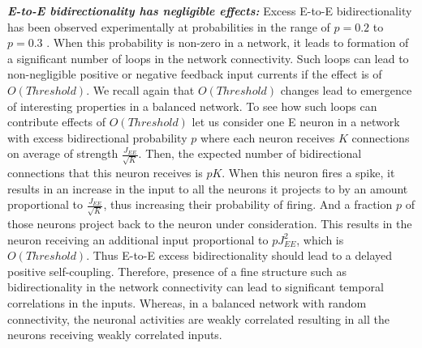 \emph{\textbf{E-to-E bidirectionality has negligible effects:}} Excess E-to-E bidirectionality has been observed experimentally at probabilities in the range of $p = 0.2$ to $p = 0.3$ \cite{Song2005}. When this probability is non-zero in a network, it leads to formation of a significant number of loops in the network connectivity. Such loops can lead to non-negligible positive or negative feedback input currents if the effect is of $O(Threshold)$. We recall again that $O(Threshold)$ changes lead to emergence of interesting properties in a balanced network. To see how such loops can contribute effects of $O(Threshold)$ let us consider one E neuron in a network with excess bidirectional probability $p$ where each neuron receives $K$ connections on average of strength $\frac{J_{EE}}{\sqrt{K}}$. Then, the expected number of bidirectional connections that this neuron receives is $pK$. When this neuron fires a spike, it results in an increase in the input to all the neurons it projects to by an amount proportional to $\frac{J_{EE}}{\sqrt{K}}$, thus increasing their probability of firing. And a fraction $p$ of those neurons project back to the neuron under consideration. This results in the neuron receiving an additional input proportional to $p J_{EE}^{2}$, which is $O(Threshold)$. Thus E-to-E excess bidirectionality should lead to a delayed positive self-coupling. Therefore, presence of a fine structure such as bidirectionality in the network connectivity can lead to significant temporal correlations in the inputs. Whereas, in a balanced network with random connectivity, the neuronal activities are weakly correlated resulting in all the neurons receiving weakly correlated inputs.\\  
